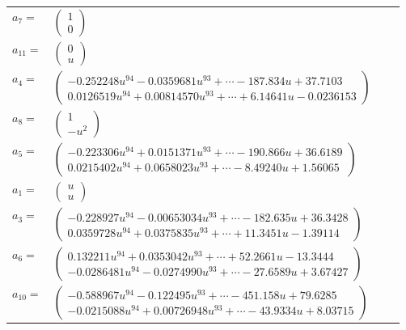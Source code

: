 \documentclass[1p]{elsarticle_modified}
\theoremstyle{definition}
\begin{document}
\begin{tabular}{m{7pt} m{180pt} m{7pt} m{180pt} }
\flushright $a_{7}=$&$\begin{pmatrix}1\\0\end{pmatrix}$ \\
\flushright $a_{11}=$&$\begin{pmatrix}0\\u\end{pmatrix}$ \\
\flushright $a_{4}=$&$\begin{pmatrix}-0.252248 u^{94}-0.0359681 u^{93}+\cdots-187.834 u+37.7103\\0.0126519 u^{94}+0.00814570 u^{93}+\cdots+6.14641 u-0.0236153\end{pmatrix}$ \\
\flushright $a_{8}=$&$\begin{pmatrix}1\\- u^2\end{pmatrix}$ \\
\flushright $a_{5}=$&$\begin{pmatrix}-0.223306 u^{94}+0.0151371 u^{93}+\cdots-190.866 u+36.6189\\0.0215402 u^{94}+0.0658023 u^{93}+\cdots-8.49240 u+1.56065\end{pmatrix}$ \\
\flushright $a_{1}=$&$\begin{pmatrix}u\\u\end{pmatrix}$ \\
\flushright $a_{3}=$&$\begin{pmatrix}-0.228927 u^{94}-0.00653034 u^{93}+\cdots-182.635 u+36.3428\\0.0359728 u^{94}+0.0375835 u^{93}+\cdots+11.3451 u-1.39114\end{pmatrix}$ \\
\flushright $a_{6}=$&$\begin{pmatrix}0.132211 u^{94}+0.0353042 u^{93}+\cdots+52.2661 u-13.3444\\-0.0286481 u^{94}-0.0274990 u^{93}+\cdots-27.6589 u+3.67427\end{pmatrix}$ \\
\flushright $a_{10}=$&$\begin{pmatrix}-0.588967 u^{94}-0.122495 u^{93}+\cdots-451.158 u+79.6285\\-0.0215088 u^{94}+0.00726948 u^{93}+\cdots-43.9334 u+8.03715\end{pmatrix}$ \\

\end{tabular}
\end{document}
